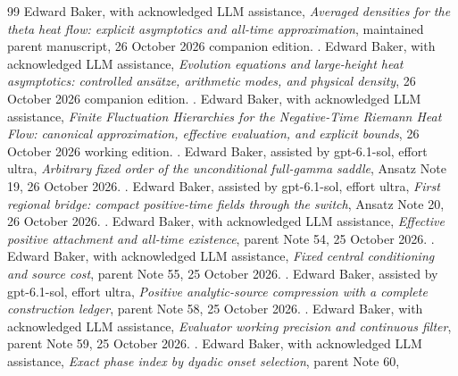 \begin{thebibliography}{99}
 Edward Baker, with acknowledged LLM assistance,
\emph{Averaged densities for the theta heat flow: explicit asymptotics and all-time approximation}, maintained parent
manuscript, 26 October 2026 companion edition.
.
 Edward Baker, with acknowledged LLM assistance,
\emph{Evolution equations and large-height heat asymptotics: controlled ans\"atze, arithmetic modes, and physical density}, 26 October 2026 companion edition.
.
 Edward Baker, with acknowledged LLM assistance,
\emph{Finite Fluctuation Hierarchies for the Negative-Time Riemann Heat Flow: canonical approximation, effective evaluation, and explicit bounds},
26 October 2026 working edition.
.
 Edward Baker, assisted by gpt-6.1-sol, effort ultra,
\emph{Arbitrary fixed order of the unconditional full-gamma saddle},
Ansatz Note 19, 26 October 2026.
.
 Edward Baker, assisted by gpt-6.1-sol, effort ultra,
\emph{First regional bridge: compact positive-time fields through the switch},
Ansatz Note 20, 26 October 2026.
.
 Edward Baker, with acknowledged LLM assistance,
\emph{Effective positive attachment and all-time existence},
parent Note 54, 25 October 2026.
.
 Edward Baker, with acknowledged LLM assistance,
\emph{Fixed central conditioning and source cost}, parent Note 55,
25 October 2026.
.
 Edward Baker, assisted by gpt-6.1-sol, effort ultra,
\emph{Positive analytic-source compression with a complete construction ledger},
parent Note 58, 25 October 2026.
.
 Edward Baker, with acknowledged LLM assistance,
\emph{Evaluator working precision and continuous filter}, parent Note 59,
25 October 2026.
.
 Edward Baker, with acknowledged LLM assistance,
\emph{Exact phase index by dyadic onset selection}, parent Note 60,

\end{thebibliography}
